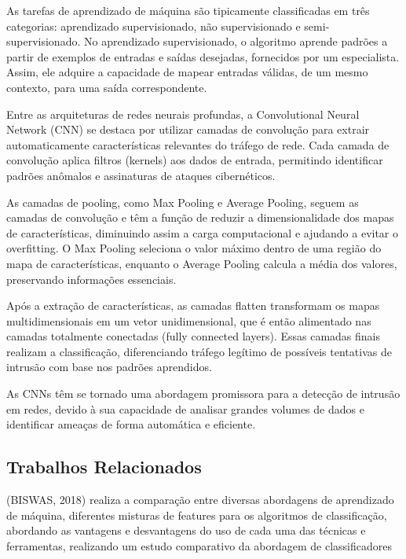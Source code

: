 \documentclass[conference]{IEEEtran}
\begin{document}
    As tarefas de aprendizado de máquina são tipicamente classificadas em três categorias: aprendizado supervisionado, não supervisionado e semi-supervisionado. No aprendizado supervisionado, o algoritmo aprende padrões a partir de exemplos de entradas e saídas desejadas, fornecidos por um especialista. Assim, ele adquire a capacidade de mapear entradas válidas, de um mesmo contexto, para uma saída correspondente.
    
    Entre as arquiteturas de redes neurais profundas, a Convolutional Neural Network (CNN) se destaca por utilizar camadas de convolução para extrair automaticamente características relevantes do tráfego de rede. Cada camada de convolução aplica filtros (kernels) aos dados de entrada, permitindo identificar padrões anômalos e assinaturas de ataques cibernéticos.

    As camadas de pooling, como Max Pooling e Average Pooling, seguem as camadas de convolução e têm a função de reduzir a dimensionalidade dos mapas de características, diminuindo assim a carga computacional e ajudando a evitar o overfitting. O Max Pooling seleciona o valor máximo dentro de uma região do mapa de características, enquanto o Average Pooling calcula a média dos valores, preservando informações essenciais.
    
    Após a extração de características, as camadas flatten transformam os mapas multidimensionais em um vetor unidimensional, que é então alimentado nas camadas totalmente conectadas (fully connected layers). Essas camadas finais realizam a classificação, diferenciando tráfego legítimo de possíveis tentativas de intrusão com base nos padrões aprendidos.
    
    As CNNs têm se tornado uma abordagem promissora para a detecção de intrusão em redes, devido à sua capacidade de analisar grandes volumes de dados e identificar ameaças de forma automática e eficiente.



\subsection{Trabalhos Relacionados}

    (BISWAS, 2018) realiza a comparação entre diversas abordagens de aprendizado de máquina, diferentes misturas de features para os algoritmos de classificação, abordando as  vantagens e desvantagens do uso de cada uma das técnicas e ferramentas, realizando um estudo
    comparativo da abordagem de classificadores
\end{document}
